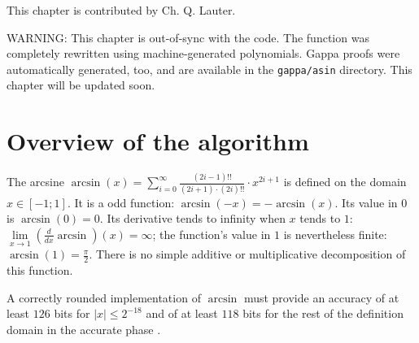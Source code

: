 %
%
%
%


This chapter is contributed by Ch. Q. Lauter.

WARNING: This chapter is out-of-sync with the code. The function was
completely rewritten using machine-generated polynomials. Gappa proofs
were automatically generated, too, and are available in the
\texttt{gappa/asin} directory. This chapter will be updated soon.

\section{Overview of the algorithm\label{sec:asin-overview}}
The arcsine $\arcsin\left( x \right) = \sum\limits_{i=0}^{\infty}
\frac{\left( 2i - 1 \right)!!}{\left(2i+1\right) \cdot \left( 2i
\right)!!} \cdot x^{2i+1}$ is defined on the domain $x \in \left[ -1;
1 \right]$. It is a odd function: $\arcsin\left(-x\right) =
-\arcsin\left( x \right)$. Its value in $0$ is $\arcsin\left( 0
\right) = 0$. Its derivative tends to infinity when $x$ tends to $1$:
$\lim\limits_{x \rightarrow 1} \left( \frac{d}{dx} \arcsin
\right)\left(x\right) = \infty$; the function's value in $1$ is
nevertheless finite: $\arcsin\left( 1 \right) = \frac{\pi}{2}$.  There
is no simple additive or multiplicative decomposition of this
function.

A correctly rounded implementation of $\arcsin$ must provide an
accuracy of at least $126$ bits for $\left \vert x \right \vert \leq
2^{-18}$ and of at least $118$ bits for the rest of the definition
domain in the accurate phase \cite{DinDefLau2004LIP}.

